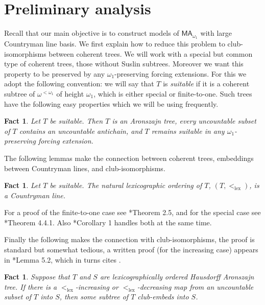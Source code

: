 \documentclass[a4paper,noamsfonts]{amsart}
\newtheorem{fact}[theorem]{Fact}
\theoremstyle{definition}
\newcommand{\MA}{\textsf{MA}}
\newcommand{\1}{\mathbbm{1}}
\DeclareMathOperator{\lex}{lex}
\begin{document}
\section{Preliminary analysis}

Recall that our main objective is to construct models of
$\MA_{\omega_{1}}$ with large Countryman line basis. We first explain
how to reduce this problem to club-isomorphisms between coherent
trees.  We will work with a special but common type of coherent trees,
those without Suslin subtrees. Moreover we want this property to be
preserved by any $\omega_{1}$-preserving forcing extensions. For this
we adopt the following convention: we will say that $T$ is
\emph{suitable} if it is a coherent subtree of $\omega^{<\omega_{1}}$ of
height $\omega_{1}$,
which is either special or finite-to-one.
Such trees have the following easy properties which we will be using
frequently.

\begin{fact}
  Let $T$ be suitable. Then $T$ is an Aronszajn tree, every uncountable
  subset of $T$ contains an uncountable antichain, and $T$ remains
  suitable in any $\omega_{1}$-preserving forcing extension.
\end{fact}

The following lemmas make the connection between coherent trees,
embeddings between Countryman lines, and club-isomorphisms.

\begin{fact}
  Let $T$ be suitable. The natural lexicographic ordering
  of $T$, $(T,<_{\lex})$, is a Countryman line.
\end{fact}

For a proof of the finite-to-one case see
\cite{TodorcevicCoherentSeqs}*{Theorem 2.5}, and for
the special case see \cite{TodorcevicWalks}*{Theorem 4.4.1}.
Also \cite{Peng2017}*{Corollary 1} handles both at the same time.

Finally the following makes the connection with club-isomorphisms,
the proof is standard but somewhat tedious, a written proof (for the increasing
case) appears in \cite{Shalev2024}*{Lemma 5.2}, which in turns
cites \cite{PengThesis}.

\begin{fact}\label{lem:club-iso-embedding}
  Suppose that $T$ and $S$ are lexicographically ordered
  Hausdorff Aronszajn tree. If there is
  a $<_{\lex}$-increasing or $<_{\lex}$-decreasing map from
  an uncountable subset of $T$ into $S$, then some
  subtree of $T$ club-embeds into $S$.
\end{fact}
\end{document}
